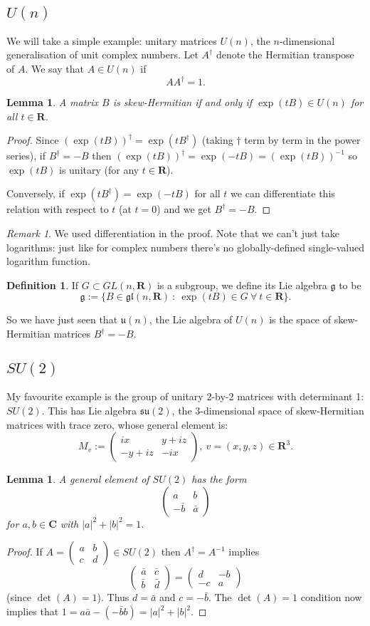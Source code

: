 \documentclass[12pt]{article}
\newcommand{\CC}{\mathbf{C}}
\newcommand{\RR}{\mathbf{R}}
\newcommand{\matr}[4]{\left(\begin{array}{cc}#1 & #2\\ #3 & #4\end{array}\right)}
\newtheorem{lma}[thm]{Lemma}
\theoremstyle{definition}
\newtheorem{dfn}[thm]{Definition}
\theoremstyle{check}
\theoremstyle{remark}
\newtheorem{rmk}[thm]{Remark}
\theoremstyle{TheoremNum}
\begin{document}
\subsection{$U(n)$}

We will take a simple example: unitary matrices $U(n)$, the $n$-dimensional generalisation of unit complex numbers. Let $A^{\dagger}$ denote the Hermitian transpose of $A$. We say that $A\in U(n)$ if
\[AA^{\dagger}=1.\]

\begin{lma}
A matrix $B$ is skew-Hermitian if and only if $\exp(tB)\in U(n)$ for all $t\in\RR$.
\end{lma}
\begin{proof}
Since $\left(\exp(tB)\right)^{\dagger}=\exp(tB^{\dagger})$ (taking $\dagger$ term by term in the power series), if $B^{\dagger}=-B$ then $\left(\exp(tB)\right)^{\dagger}=\exp(-tB)=(\exp(tB))^{-1}$ so $\exp(tB)$ is unitary (for any $t\in\RR$).

Conversely, if $\exp(tB^{\dagger})=\exp(-tB)$ for all $t$ we can differentiate this relation with respect to $t$ (at $t=0$) and we get $B^{\dagger}=-B$.
\end{proof}

\begin{rmk}
We used differentiation in the proof. Note that we can't just take logarithms: just like for complex numbers there's no globally-defined single-valued logarithm function.
\end{rmk}

\begin{dfn}
If $G\subset GL(n,\RR)$ is a subgroup, we define its Lie algebra $\mathfrak{g}$ to be
\[\mathfrak{g}:=\{B\in \mathfrak{gl}(n,\RR)\ :\ \exp(tB)\in G\ \forall\ t\in\RR\}.\]
\end{dfn}
So we have just seen that $\mathfrak{u}(n)$, the Lie algebra of $U(n)$ is the space of skew-Hermitian matrices $B^{\dagger}=-B$.


\subsection{$SU(2)$}

My favourite example is the group of unitary 2-by-2 matrices with determinant 1: $SU(2)$. This has Lie algebra $\mathfrak{su}(2)$, the 3-dimensional space of skew-Hermitian matrices with trace zero, whose general element is:
\[M_v:=\matr{ix}{y+iz}{-y+iz}{-ix},\ v=(x,y,z)\in\RR^3.\]

\begin{lma}
A general element of $SU(2)$ has the form
\[\matr{a}{b}{-\bar{b}}{\bar{a}}\]
for $a,b\in\CC$ with $|a|^2+|b|^2=1$.
\end{lma}
\begin{proof}
If $A=\matr{a}{b}{c}{d}\in SU(2)$ then $A^{\dagger}=A^{-1}$ implies
\[\matr{\bar{a}}{\bar{c}}{\bar{b}}{\bar{d}}=\matr{d}{-b}{-c}{a}\]
(since $\det(A)=1$). Thus $d=\bar{a}$ and $c=-\bar{b}$. The $\det(A)=1$ condition now implies that $1=a\bar{a}-(-\bar{b}b)=|a|^2+|b|^2$.
\end{proof}
\end{document}
